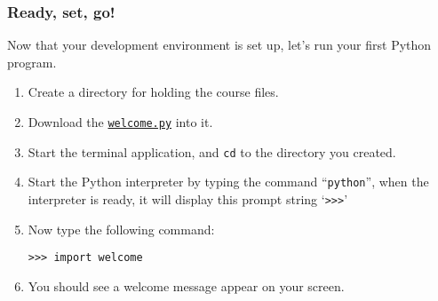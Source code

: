 \documentclass[english,serif,mathserif,xcolor=pdftex,dvipsnames,table]{beamer}
\begin{document}
\begin{frame}[fragile]
  \frametitle{Ready, set, go!}

  Now that your development environment is set up, let's run your
  first Python program.
  \begin{enumerate}
  \item Create a directory for holding the course files.
  \item Download the \href{https://raw.github.com/gc3-uzh-ch/python-course/master/welcome.py}{\texttt{welcome.py}} into it.
  \item Start the terminal application, and \texttt{cd} to the directory you created.
  \item Start the Python interpreter by typing the command ``\texttt{python}'', when the interpreter is ready, it will display this prompt string `\texttt{>>>}'
  \item Now type the following command:
    \begin{lstlisting}
>>> import welcome
    \end{lstlisting}
  \item You should see a welcome message appear on your screen.
  \end{enumerate}

\end{frame}
\end{document}

